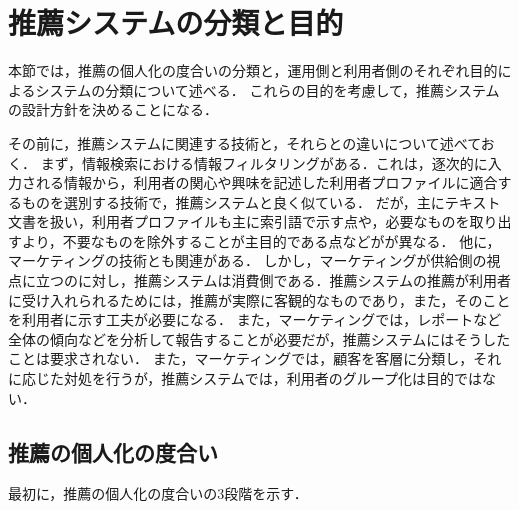 \chapter{推薦システムの分類と目的}
\label{chap:category}

本節では，推薦の個人化の度合いの分類と，運用側と利用者側のそれぞれ目的によるシステムの分類について述べる．
これらの目的を考慮して，推薦システムの設計方針を決めることになる．

その前に，推薦システムに関連する技術と，それらとの違いについて述べておく．
まず，情報検索における情報フィルタリングがある．これは，逐次的に入力される情報から，利用者の関心や興味を記述した利用者プロファイルに適合するものを選別する技術\cite{jb:012:00}で，推薦システムと良く似ている．
だが，主にテキスト文書を扱い，利用者プロファイルも主に索引語で示す点や，必要なものを取り出すより，不要なものを除外することが主目的である点などがが異なる．
他に，マーケティングの技術とも関連がある．
しかし，マーケティングが供給側の視点に立つのに対し，推薦システムは消費側である．推薦システムの推薦が利用者に受け入れられるためには，推薦が実際に客観的なものであり，また，そのことを利用者に示す工夫が必要になる．
また，マーケティングでは，レポートなど全体の傾向などを分析して報告することが必要だが，推薦システムにはそうしたことは要求されない．
また，マーケティングでは，顧客を客層に分類し，それに応じた対処を行うが，推薦システムでは，利用者のグループ化は目的ではない．

\section{推薦の個人化の度合い}
\label{sec:plevel}

最初に，推薦の個人化の度合いの3段階\cite{dmkd:01:01}を示す．

